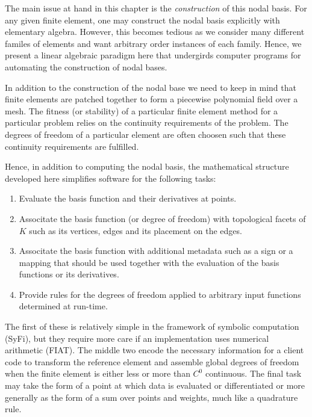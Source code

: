 The main issue at hand in this chapter is the \emph{construction} of
this nodal basis.  For
any given finite element, one may construct the nodal basis
explicitly with elementary algebra.  However, this becomes tedious as
we consider many different familes of elements and want arbitrary
order instances of each family.  Hence, we present a linear algebraic
paradigm here that undergirds computer programs for automating the
construction of nodal bases.

In addition to the construction of the nodal base we need to keep in mind that
finite elements are patched together to form a piecewise
polynomial field over a mesh. The fitness (or stability) of a particular finite element method for a particular problem relies on the continuity
requirements of the problem. The degrees of freedom of a particular element
are often choosen such that these continuity requirements are fulfilled.

Hence, in addition to computing the nodal basis, the mathematical structure developed here
simplifies software for the following tasks:

\begin{enumerate}
\item Evaluate the basis function and their derivatives at points.
\item Associtate the basis function (or degree of freedom) with
      topological facets of \( K \) such as its vertices, edges and its
      placement on the edges.
\item Associtate the basis function with additional metadata such
      as a sign or a mapping that should be used together with
      the evaluation of the basis functions or its derivatives.
\item Provide rules for the degrees of freedom applied to arbitrary input
      functions determined at run-time.
\end{enumerate}


The first of these is relatively simple in the framework
of symbolic computation (SyFi), but they require more care if an
implementation uses numerical arithmetic (FIAT).  The middle two
encode the necessary information for a client code to transform the
reference element and assemble global degrees of freedom when the
finite element is either less or more than $C^0$ continuous. The final
task may take the form of a point at which data is evaluated or
differentiated or more generally as the form of a sum over points and
weights,  much like a quadrature rule.

